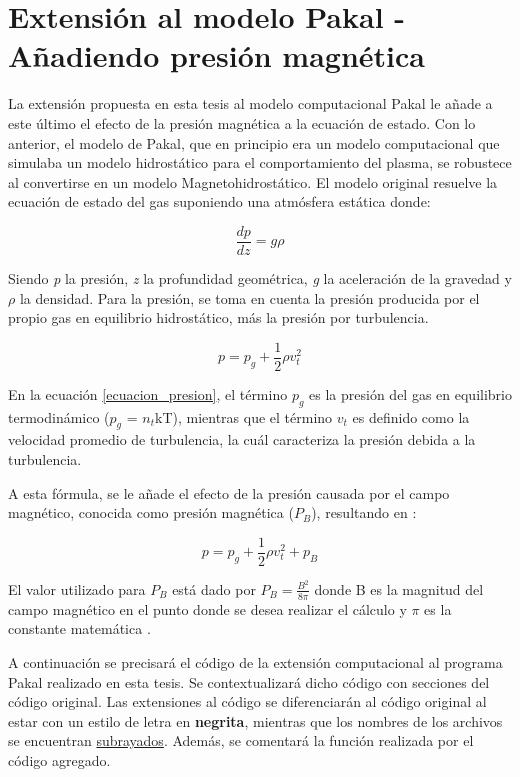 \chapter{Extensi\'on al modelo Pakal \-- A\~nadiendo presi\'on magn\'etica}

La extensi\'on propuesta en esta tesis al modelo computacional Pakal le a\~nade a este \'ultimo el efecto de la presi\'on magn\'etica a la ecuaci\'on de estado. Con lo anterior, el modelo de Pakal, que en principio era un modelo computacional que simulaba un modelo hidrost\'atico para el comportamiento del plasma, se robustece al convertirse en un modelo Magnetohidrost\'atico. El modelo original resuelve la ecuaci\'on de estado del gas suponiendo una atm\'osfera est\'atica donde:

\begin{equation} \label{ecuacion_hidrostatica}
\frac{dp}{dz} = g\rho
\end{equation}

Siendo \textit{p} la presi\'on, \textit{z} la profundidad geom\'etrica, \textit{g} la aceleraci\'on de la gravedad y \textit{$\rho$} la densidad. Para la presi\'on, se toma en cuenta la presi\'on producida por el propio gas en equilibrio hidrost\'atico, m\'as la presi\'on por turbulencia.

\begin{equation} \label{ecuacion_presion}
p = p_g + \frac{1}{2}\rho v_t^2
\end{equation}

En la ecuaci\'on \ref{ecuacion_presion}, el t\'ermino $p_g$ es la presi\'on del gas en equilibrio termodin\'amico ($p_g$ = $n_t$kT), mientras que el t\'ermino $v_t$ es definido como la velocidad promedio de turbulencia, la cu\'al caracteriza la presi\'on debida a la turbulencia.

A esta f\'ormula, se le a\~nade el efecto de la presi\'on causada por el campo magn\'etico, conocida como presi\'on magn\'etica ($P_B$), resultando en \citep{priest}: 

\begin{equation} \label{mhs}
p = p_g + \frac{1}{2}\rho v_t^2 + p_B
\end{equation}

El valor utilizado para $P_B$ est\'a dado por $P_B = \frac{B^2}{8\pi}$ donde B es la magnitud del campo magn\'etico en el punto donde se desea realizar el c\'alculo y $\pi$ es la constante matem\'atica \citep{PBvalue}. 

A continuaci\'on se precisar\'a el c\'odigo de la extensi\'on computacional al programa Pakal realizado en esta tesis. Se contextualizar\'a dicho c\'odigo con secciones del c\'odigo original. Las extensiones al c\'odigo se diferenciar\'an al c\'odigo original al estar con un estilo de letra en \textbf{negrita}, mientras que los nombres de los archivos se encuentran \underline{subrayados}. Adem\'as, se comentar\'a la funci\'on realizada por el c\'odigo agregado. 

